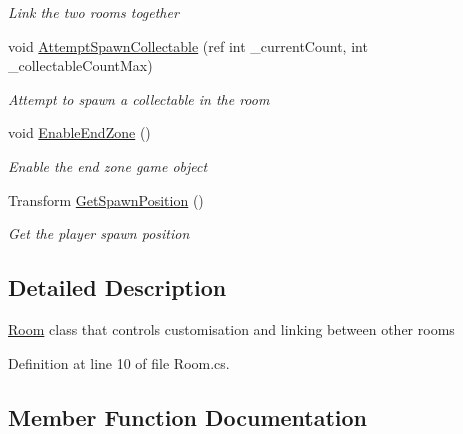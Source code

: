 \begin{DoxyCompactItemize}
\begin{DoxyCompactList}\small\item\em Link the two rooms together \end{DoxyCompactList}\item 
void \mbox{\hyperlink{class_level_generation_1_1_room_adfc209b5289f68c3c105e1590a4dd652}{Attempt\+Spawn\+Collectable}} (ref int \+\_\+current\+Count, int \+\_\+collectable\+Count\+Max)
\begin{DoxyCompactList}\small\item\em Attempt to spawn a collectable in the room \end{DoxyCompactList}\item 
void \mbox{\hyperlink{class_level_generation_1_1_room_ae87c91e9280cfb6043c6d3bfe720d1ef}{Enable\+End\+Zone}} ()
\begin{DoxyCompactList}\small\item\em Enable the end zone game object \end{DoxyCompactList}\item 
Transform \mbox{\hyperlink{class_level_generation_1_1_room_a3c9be1844b28b37af37ab01e199361d0}{Get\+Spawn\+Position}} ()
\begin{DoxyCompactList}\small\item\em Get the player spawn position \end{DoxyCompactList}\end{DoxyCompactItemize}


\subsection{Detailed Description}
\mbox{\hyperlink{class_level_generation_1_1_room}{Room}} class that controls customisation and linking between other rooms 



Definition at line 10 of file Room.\+cs.



\subsection{Member Function Documentation}
\mbox{\label{class_level_generation_1_1_room_adfc209b5289f68c3c105e1590a4dd652}} 
